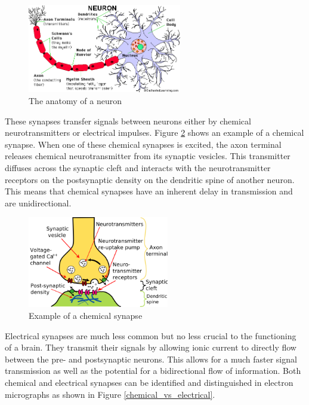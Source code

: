 \documentclass[a4paper, 11pt]{article}
\numberwithin{equation}{section}
\begin{document}
\begin{figure}[H]
	\centering
	\includegraphics[width = 0.6\textwidth]{Neuron.jpg}
	\caption[]{The anatomy of a neuron\footnotemark}
	\label{neuron}
\end{figure}


These synapses transfer signals between neurons either by chemical neurotransmitters or electrical impulses. Figure \ref{synapse} shows an example of a chemical synapse. When one of these chemical synapses is excited, the axon terminal releases chemical neurotransmitter from its synaptic vesicles. This transmitter diffuses across the synaptic cleft and interacts with the neurotransmitter receptors on the postsynaptic density on the dendritic spine of another neuron. This means that chemical synapses have an inherent delay in transmission and are unidirectional.

\begin{figure}[h]
	\centering
	\includegraphics[width=0.55\textwidth]{synapse}
	\caption[]{Example of a chemical synapse\footnotemark}
	\label{synapse}
\end{figure}

Electrical synapses are much less common but no less crucial to the functioning of a brain. They transmit their signals by allowing ionic current to directly flow between the pre- and postsynaptic neurons. This allows for a much faster signal transmission as well as the potential for a bidirectional flow of information. Both chemical and electrical synapses can be identified and distinguished in electron micrographs as shown in Figure \ref{chemical_vs_electrical}.
\end{document}
